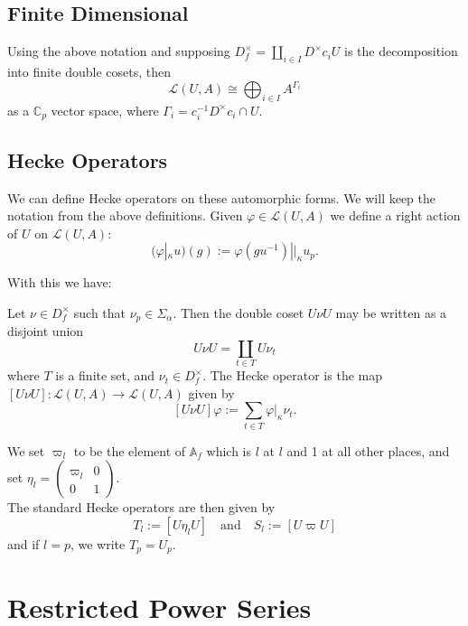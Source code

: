\section{Finite Dimensional}

\begin{lemma}
  Using the above notation and supposing $D_f^\times = \coprod_{i \in I} D^\times c_i U$
  is the decomposition into finite double cosets, then
  \[
    \mathcal{L}(U,A) \cong \bigoplus_{i \in I} A^{\Gamma_i}
  \]
  as a $\mathbb{C}_p$ vector space, where $\Gamma_i = c_i^{-1} D^\times c_i \cap U$.
\end{lemma}

\section{Hecke Operators}

We can define Hecke operators on these automorphic forms. We will keep the notation from the above
definitions.
Given $\varphi \in \mathcal{L}(U,A)$ we define a right action of $U$ on $\mathcal{L}(U,A)$:
\[
  (\varphi |_\kappa u) (g) := \varphi (gu^{-1}) ||_\kappa u_p.
\]

With this we have:
\begin{definition}
  Let $\nu \in D^\times_f$ such that $\nu_p \in \Sigma_\alpha$. Then the double coset $U\nu U$ may
  be written as a disjoint union
  \[
    U \nu U = \coprod_{t \in T} U \nu_t
  \]
  where $T$ is a finite set, and $\nu_t \in D_f^\times$. The Hecke operator is the map
  $[U \nu U] : \mathcal{L}(U,A) \to \mathcal{L}(U,A)$ given by
  \[
    [U \nu U] \varphi := \sum_{t \in T} \varphi |_\kappa \nu_t.
  \]
\end{definition}

\begin{definition}
  We set $\varpi_l$ to be the element of $\mathbb{A}_f$ which is $l$ at  $l$ and 1 at all other
  places, and set $\eta_l = \begin{pmatrix} \varpi_l & 0 \\ 0 &1 \end{pmatrix}$.\\
  The standard Hecke operators are then given by
  \[
    T_l := [U \eta_l U] \quad \text{and} \quad S_l:=[U \varpi U]
  \]
  and if $l = p$, we write $T_p = U_p$.
\end{definition}


\chapter{Restricted Power Series}

